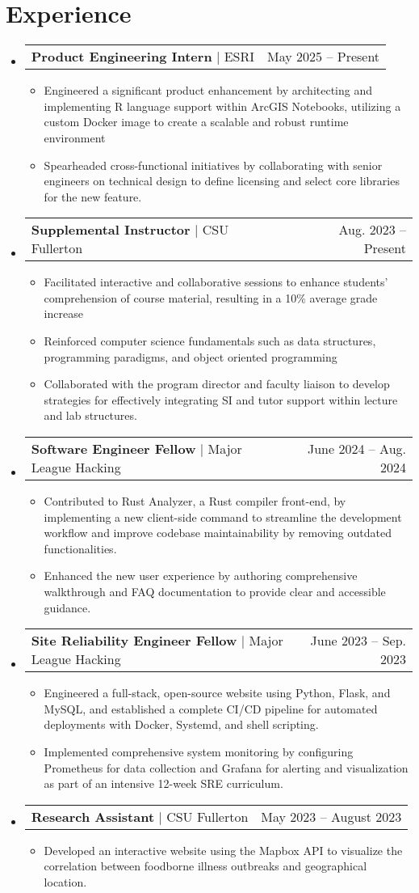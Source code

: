 \documentclass[letterpaper,11pt]{article}
\makeatletter
\newcommand{\resumeItem}[1]{
  \item\small{
    {#1 \vspace{-2pt}}
  }
}
\newcommand{\resumeProjectHeading}[2]{
    \item
    \begin{tabular*}{0.97\textwidth}{l@{\extracolsep{\fill}}r}
      \small#1 & #2 \\
    \end{tabular*}\vspace{-7pt}
}
\newcommand{\resumeSubHeadingListStart}{\begin{itemize}[leftmargin=0.15in, label={}]}
\newcommand{\resumeSubHeadingListEnd}{\end{itemize}}
\newcommand{\resumeItemListStart}{\begin{itemize}}
\newcommand{\resumeItemListEnd}{\end{itemize}\vspace{-5pt}}
\makeatother
\begin{document}
\section{Experience}
  \resumeSubHeadingListStart
    \resumeProjectHeading
            {\textbf{Product Engineering Intern} $|$ {ESRI}}{May 2025 -- Present}
            \resumeItemListStart
              \resumeItem{Engineered a significant product enhancement by architecting and implementing R language support within ArcGIS Notebooks, utilizing a custom Docker image to create a scalable and robust runtime environment}
              \resumeItem{Spearheaded cross-functional initiatives by collaborating with senior engineers on technical design to define licensing and select core libraries for the new feature.}
    \resumeItemListEnd
    \resumeProjectHeading
            {\textbf{Supplemental Instructor} $|$ {CSU Fullerton}}{Aug. 2023 -- Present}
            \resumeItemListStart
              \resumeItem{Facilitated interactive and collaborative sessions to enhance students' comprehension of course material, resulting in a 10\% average grade increase}
              \resumeItem{Reinforced computer science fundamentals such as data structures, programming paradigms, and object oriented programming}
              \resumeItem{Collaborated with the program director and faculty liaison to develop strategies for effectively integrating SI and tutor support within lecture and lab structures.}
    \resumeItemListEnd
    \resumeProjectHeading
          {\textbf{Software Engineer Fellow} $|$ {Major League Hacking}}{June 2024 -- Aug. 2024}
          \resumeItemListStart
            \resumeItem{Contributed to Rust Analyzer, a Rust compiler front-end, by implementing a new client-side command to streamline the development workflow and improve codebase maintainability by removing outdated functionalities.}
            \resumeItem{Enhanced the new user experience by authoring comprehensive walkthrough and FAQ documentation to provide clear and accessible guidance.}
          \resumeItemListEnd
    \resumeProjectHeading
          {\textbf{Site Reliability Engineer Fellow} $|$ {Major League Hacking}}{June 2023 -- Sep. 2023}
          \resumeItemListStart
            \resumeItem{Engineered a full-stack, open-source website using Python, Flask, and MySQL, and established a complete CI/CD pipeline for automated deployments with Docker, Systemd, and shell scripting.}
            \resumeItem{Implemented comprehensive system monitoring by configuring Prometheus for data collection and Grafana for alerting and visualization as part of an intensive 12-week SRE curriculum.}
          \resumeItemListEnd
    \resumeProjectHeading
          {\textbf{Research Assistant} $|$ {CSU Fullerton}}{May 2023 -- August 2023}
          \resumeItemListStart
            \resumeItem{Developed an interactive website using the Mapbox API to visualize the correlation between foodborne illness outbreaks and geographical location.}
          \resumeItemListEnd
  \resumeSubHeadingListEnd
\end{document}
